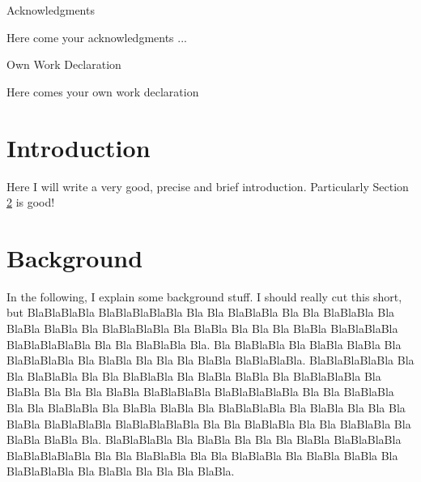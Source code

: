 \documentclass[11pt,twoside]{article}
\numberwithin{Theorem}{section}
\numberwithin{Definition}{section}
\numberwithin{Lemma}{section}
\numberwithin{Algorithm}{section}
\numberwithin{equation}{section}
\begin{document}
\begin{center}
\Large{Acknowledgments}
\end{center}

Here come your acknowledgments ...

\clearpage

\begin{center}
\Large{Own Work Declaration}
\end{center}

Here comes your own work declaration

\cleardoublepage



\pagestyle{plain}
\setcounter{page}{1}

\tableofcontents
\clearpage
\listoftables
\listoffigures
\cleardoublepage

\setcounter{page}{1}

\nocite{*}

\clearpage

\section{Introduction}
\label{sec.intro}

Here I will write a very good, precise and brief introduction.
Particularly Section \ref{sec:background} is good!
\clearpage

\section{Background}
\label{sec:background}

In the following, I explain some background stuff. I should really cut this short, but BlaBlaBlaBla BlaBlaBlaBlaBla Bla Bla BlaBlaBla Bla Bla BlaBlaBla Bla BlaBla BlaBla Bla BlaBlaBlaBla Bla BlaBla Bla Bla Bla BlaBla BlaBlaBlaBla BlaBlaBlaBlaBla Bla Bla BlaBlaBla Bla. Bla BlaBlaBla Bla BlaBla BlaBla Bla BlaBlaBlaBla Bla BlaBla Bla Bla Bla BlaBla BlaBlaBlaBla. BlaBlaBlaBlaBla Bla Bla BlaBlaBla Bla Bla BlaBlaBla Bla BlaBla BlaBla Bla BlaBlaBlaBla Bla BlaBla Bla Bla Bla BlaBla BlaBlaBlaBla BlaBlaBlaBlaBla Bla Bla BlaBlaBla Bla Bla BlaBlaBla Bla BlaBla BlaBla Bla BlaBlaBlaBla Bla BlaBla Bla Bla Bla BlaBla BlaBlaBlaBla BlaBlaBlaBlaBla Bla Bla BlaBlaBla Bla Bla BlaBlaBla Bla BlaBla BlaBla Bla. BlaBlaBlaBla Bla BlaBla Bla Bla Bla BlaBla BlaBlaBlaBla BlaBlaBlaBlaBla Bla Bla BlaBlaBla Bla Bla BlaBlaBla Bla BlaBla BlaBla Bla BlaBlaBlaBla Bla BlaBla Bla Bla Bla BlaBla.
\end{document}
